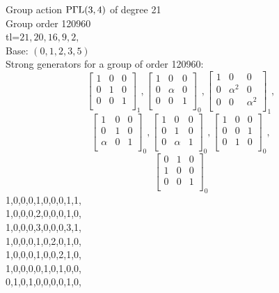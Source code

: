 Group action ${\rm P}\Gamma {\rm L}(3,4)$ of degree 21\\
Group order 120960\\
tl=$21, 20, 16, 9, 2, $\\
Base: $( 0, 1, 2, 3, 5 )$\\
{\small\arraycolsep=2pt
Strong generators for a group of order 120960:
$$
\left[
\begin{array}{*{3}{r}}
1 & 0 & 0\\
0 & 1 & 0\\
0 & 0 & 1\\
\end{array}
\right]
_{1}
, 
\left[
\begin{array}{*{3}{r}}
1 & 0 & 0\\
0 & \alpha  & 0\\
0 & 0 & 1\\
\end{array}
\right]
_{0}
, 
\left[
\begin{array}{*{3}{r}}
1 & 0 & 0\\
0 & \alpha^{2} & 0\\
0 & 0 & \alpha^{2}\\
\end{array}
\right]
_{1}
, 
$$
$$
\left[
\begin{array}{*{3}{r}}
1 & 0 & 0\\
0 & 1 & 0\\
\alpha  & 0 & 1\\
\end{array}
\right]
_{0}
, 
\left[
\begin{array}{*{3}{r}}
1 & 0 & 0\\
0 & 1 & 0\\
0 & \alpha  & 1\\
\end{array}
\right]
_{0}
, 
\left[
\begin{array}{*{3}{r}}
1 & 0 & 0\\
0 & 0 & 1\\
0 & 1 & 0\\
\end{array}
\right]
_{0}
, 
$$
$$
\left[
\begin{array}{*{3}{r}}
0 & 1 & 0\\
1 & 0 & 0\\
0 & 0 & 1\\
\end{array}
\right]
_{0}
$$
1,0,0,0,1,0,0,0,1,1,\\
1,0,0,0,2,0,0,0,1,0,\\
1,0,0,0,3,0,0,0,3,1,\\
1,0,0,0,1,0,2,0,1,0,\\
1,0,0,0,1,0,0,2,1,0,\\
1,0,0,0,0,1,0,1,0,0,\\
0,1,0,1,0,0,0,0,1,0,\\
}

